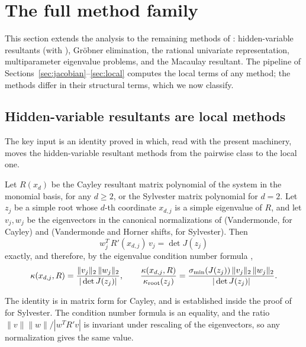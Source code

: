 \section{The full method family}\label{sec:family}

This section extends the analysis to the remaining methods of \cite{graf2026numerical}:
hidden-variable resultants (with \cite{noferini2016numerical}), Gr\"obner elimination, the
rational univariate representation, multiparameter eigenvalue problems, and the Macaulay
resultant. The pipeline of Sections~\ref{sec:jacobian}--\ref{sec:local} computes the local
terms of any method; the methods differ in their structural terms, which we now classify.

\subsection{Hidden-variable resultants are local methods}

The key input is an identity proved in \cite{noferini2016numerical} which, read with the
present machinery, moves the hidden-variable resultant methods from the pairwise class to
the local one.

\begin{lemma}\label{lem:hiddenvariable}
  Let $R(x_d)$ be the Cayley resultant matrix polynomial of the system in the monomial
  basis, for any $d\ge2$, or the Sylvester matrix polynomial for $d=2$. Let $z_j$ be a
  simple root whose $d$-th coordinate $x_{d,j}$ is a simple eigenvalue of $R$, and let
  $v_j,w_j$ be the eigenvectors in the canonical normalizations of
  \cite[Lem.~3.5]{noferini2016numerical} (Vandermonde, for Cayley) and
  \cite[Lem.~4.4]{noferini2016numerical} (Vandermonde and Horner shifts, for Sylvester).
  Then
  \[
    w_j^T\,R'(x_{d,j})\,v_j = \det J(z_j)
  \]
  exactly, and therefore, by the eigenvalue condition number formula
  \cite[Lem.~2.11]{noferini2016numerical},
  \[
    \kappa(x_{d,j},R) = \frac{\|v_j\|_2\,\|w_j\|_2}{|\det J(z_j)|},
    \qquad
    \frac{\kappa(x_{d,j},R)}{\kappa_{\mathrm{root}}(z_j)}
    = \frac{\sigma_{\min}(J(z_j))\,\|v_j\|_2\,\|w_j\|_2}{|\det J(z_j)|}.
  \]
\end{lemma}

\proof
The identity is \cite[Thm.~3.6]{noferini2016numerical} in matrix form for Cayley, and is
established inside the proof of \cite[Lem.~4.5]{noferini2016numerical} for Sylvester. The
condition number formula is an equality, and the ratio $\|v\|\|w\|/|w^TR'v|$ is invariant
under rescaling of the eigenvectors, so any normalization gives the same value.
\endproof

